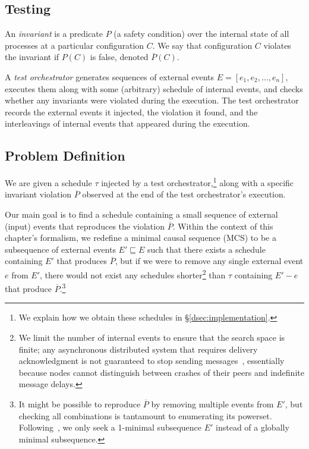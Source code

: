 \subsection{Testing}

An {\em invariant} is a predicate $P$ (a safety
condition) over the internal state of all processes at a particular
configuration $C$. We say that configuration
$C$ violates the invariant if $P\left(C\right)$ is false, denoted $\overline{P}\left(C\right)$.

A {\em test orchestrator} generates sequences of external events
$E = [ e_1, e_2, \ldots, e_n ]$, executes them along with some
(arbitrary) schedule of internal
events, and checks whether any invariants were violated during the execution.
The test orchestrator records the external events it injected, the
violation it found, and the
interleavings of internal events that appeared during the execution.

\subsection{Problem Definition}

We are given a schedule $\tau$ injected by a test orchestrator,\footnote{We
explain how we obtain these schedules in \S\ref{dsec:implementation}.} along
with a specific invariant violation $\overline{P}$ observed at the end of the
test orchestrator's execution.

Our main goal is to find a schedule containing a small sequence of
external (input) events that reproduces the violation $\overline{P}$.
Within the context of this chapter's formalism, we redefine a minimal causal sequence (MCS)
to be a subsequence of external events $E' \sqsubseteq E$ such that there exists
a schedule containing $E'$ that produces
$\overline{P}$, but if we were to remove any
single external event $e$ from $E'$, there would not exist any schedules
shorter\footnote{We limit the number of internal events to ensure
that the search space is finite; any asynchronous
distributed system that requires
delivery acknowledgment is not guaranteed
to stop sending messages~\cite{aguilera1997heartbeat}, essentially because nodes cannot distinguish
between crashes of their peers and indefinite message delays.} than $\tau$
containing $E' - e$ that produce
$\overline{P}$.\footnote{It might be possible to reproduce $\overline{P}$ by
removing multiple events from $E'$,
but checking all combinations is tantamount to enumerating its powerset.
Following~\cite{Zeller:2002:SIF:506201.506206}, we
only seek a 1-minimal subsequence $E'$ instead of a globally minimal
subsequence.}

